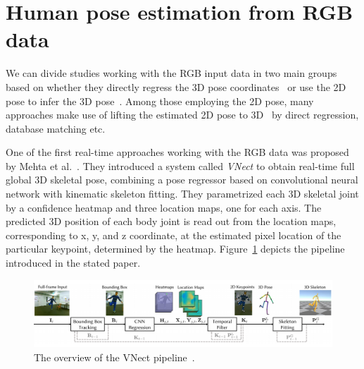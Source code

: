 \section{Human pose estimation from RGB data}
We can divide studies working with the RGB input data in two main groups based on whether they directly regress the 3D pose coordinates~\cite{DBLP:journals/corr/MartinezHRL17,DBLP:journals/corr/0001SLW17} or use the 2D pose to infer the 3D pose~\cite{DBLP:journals/corr/ChenR16a,mono-3dhp2017,singleshotmultiperson2018,VNect_SIGGRAPH2017,lcrnet}. Among those employing the 2D pose, many approaches make use of lifting the estimated 2D pose to 3D~\cite{DBLP:journals/corr/ChenR16a,DBLP:journals/corr/IqbalDYK0G17,DBLP:journals/corr/MartinezHRL17,DBLP:journals/corr/Moreno-Noguer16} by direct regression, database matching etc. \par
\vspace{5mm}
\noindent One of the first real-time approaches working with the RGB data was proposed by Mehta et al.~\cite{VNect_SIGGRAPH2017}. They introduced a system called \textit{VNect} to obtain real-time full global 3D skeletal pose, combining a pose regressor based on convolutional neural network with kinematic skeleton fitting. They parametrized each 3D skeletal joint by a confidence heatmap and three location maps, one for each axis. The predicted 3D position of each body joint is read out from the location maps, corresponding to x, y, and z coordinate, at the estimated pixel location of the particular keypoint, determined by the heatmap. Figure~\ref{fig:Vnect} depicts the pipeline introduced in the stated paper.\par

\vspace{5mm}
\begin{figure}[H]
\begin{center}
  \includegraphics[width=\textwidth]{images/related_work/VNect.PNG}
  \caption[The overview of the VNect pipeline.]{The overview of the VNect pipeline~\cite{VNect_SIGGRAPH2017}.}
  \label{fig:Vnect}
\end{center}
\end{figure}

